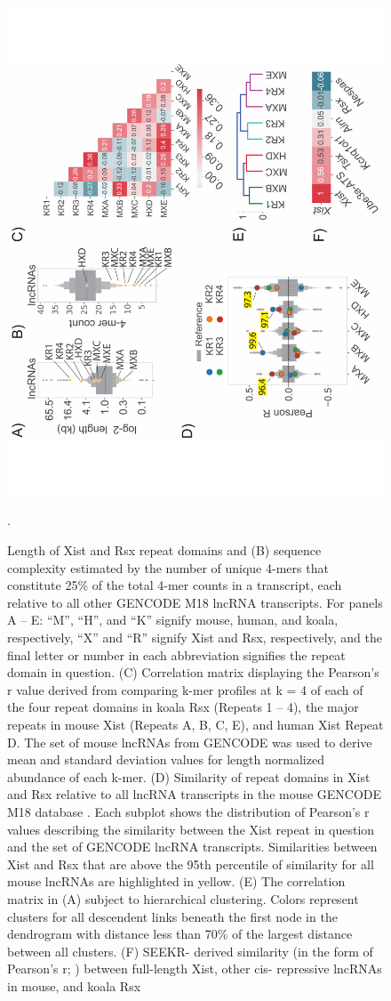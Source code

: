\begin{figure}[!h]
\centering
\includegraphics[angle=-90,width=.8\textwidth]{images/fig2_-01.pdf}
\caption[Domain based sequence similarity]{Length of Xist and Rsx repeat domains and (B) sequence complexity estimated by the number of unique 4-mers that constitute 25\% of the total 4-mer counts in a transcript, each relative to all other GENCODE M18 lncRNA transcripts. For panels A – E: “M”, “H”, and “K” signify mouse, human, and koala, respectively, “X” and “R” signify Xist and Rsx, respectively, and the final letter or number in each abbreviation signifies the repeat domain in question. (C) Correlation matrix displaying the Pearson’s r value derived from comparing k-mer profiles at k = 4 of each of the four repeat domains in koala Rsx (Repeats 1 – 4), the major repeats in mouse Xist (Repeats A, B, C, E), and human Xist Repeat D. The set of mouse lncRNAs from GENCODE was used to derive mean and standard deviation values for length normalized abundance of each k-mer. (D) Similarity of repeat domains in Xist and Rsx relative to all lncRNA transcripts in the mouse GENCODE M18 database \cite{Derrien2012TheExpression}. Each subplot shows the distribution of Pearson’s r values describing the similarity between the Xist repeat in question and the set of GENCODE lncRNA transcripts. Similarities between Xist and Rsx that are above the 95th percentile of similarity for all mouse lncRNAs are highlighted in yellow. (E) The correlation matrix in (A) subject to hierarchical clustering. Colors represent clusters for all descendent links beneath the first node in the dendrogram with distance less than 70\% of the largest distance between all clusters. (F) SEEKR- derived similarity (in the form of Pearson’s r; \cite{Kirk2018FunctionalContent}) between full-length Xist, other cis- repressive lncRNAs in mouse, and koala Rsx \cite{Johnson2018AdaptationGenome}}. 
\end{figure}

